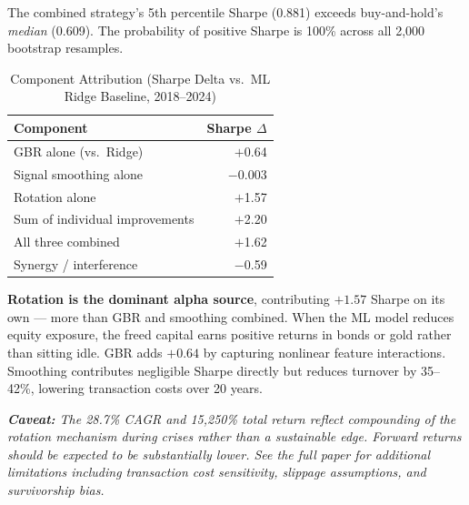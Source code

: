 \documentclass[11pt]{article}
\begin{document}
\noindent The combined strategy's 5th percentile Sharpe (0.881) exceeds buy-and-hold's \emph{median} (0.609). The probability of positive Sharpe is 100\% across all 2{,}000 bootstrap resamples.

\begin{table}[ht]
\centering
\caption{Component Attribution (Sharpe Delta vs.\ ML Ridge Baseline, 2018--2024)}
\small
\begin{tabular}{lr}
\toprule
\textbf{Component} & \textbf{Sharpe $\Delta$} \\
\midrule
GBR alone (vs.\ Ridge) & $+$0.64 \\
Signal smoothing alone & $-$0.003 \\
Rotation alone & $+$1.57 \\
\midrule
Sum of individual improvements & $+$2.20 \\
All three combined & $+$1.62 \\
\midrule
Synergy / interference & $-$0.59 \\
\bottomrule
\end{tabular}
\end{table}

\noindent \textbf{Rotation is the dominant alpha source}, contributing $+1.57$ Sharpe on its own --- more than GBR and smoothing combined. When the ML model reduces equity exposure, the freed capital earns positive returns in bonds or gold rather than sitting idle. GBR adds $+0.64$ by capturing nonlinear feature interactions. Smoothing contributes negligible Sharpe directly but reduces turnover by 35--42\%, lowering transaction costs over 20 years.

\bigskip
\noindent\textit{\textbf{Caveat:} The 28.7\% CAGR and 15{,}250\% total return reflect compounding of the rotation mechanism during crises rather than a sustainable edge. Forward returns should be expected to be substantially lower. See the full paper for additional limitations including transaction cost sensitivity, slippage assumptions, and survivorship bias.}
\end{document}
